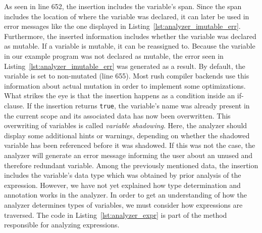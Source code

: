 
As seen in line 652, the insertion includes the variable's span.
Since the span includes the location of where the variable was declared,
it can later be used in error messages like the one displayed in Listing~\ref{lst:analyzer_imutable_err}.
Furthermore, the inserted information includes whether the variable was declared as mutable.
If a variable is mutable, it can be reassigned to.
Because the variable in our example program was not declared as mutable,
the error seen in Listing~\ref{lst:analyzer_imutable_err} was generated as a result.
By default, the variable is set to non-mutated (line 655).
Most rush compiler backends use this information about actual mutation in order to implement some optimizations.
What strikes the eye is that the insertion happens as a condition inside an if-clause.
If the insertion returns \texttt{true}, the variable's name was already present in the current scope and its associated data has now been overwritten.
This overwriting of variables is called \emph{variable shadowing}.
Here, the analyzer should display some additional hints or warnings, depending on whether the shadowed variable has been referenced before it was shadowed.
If this was not the case, the analyzer will generate an error message informing the user about an unused and therefore redundant variable.
Among the previously mentioned data, the insertion includes the variable's data type which was obtained by prior analysis of the expression.
However, we have not yet explained how type determination and annotation works in the analyzer.
In order to get an understanding of how the analyzer determines types of variables, we must consider how expressions are traversed.
The code in Listing~\ref{lst:analyzer_expr} is part of the method responsible for analyzing expressions.


